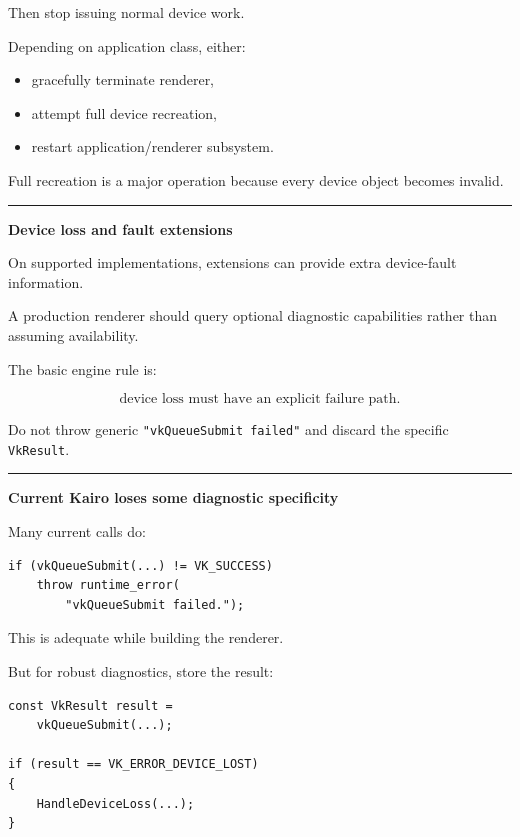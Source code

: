 Then stop issuing normal device work.

Depending on application class, either:

\begin{itemize}
\tightlist
\item
  gracefully terminate renderer,
\item
  attempt full device recreation,
\item
  restart application/renderer subsystem.
\end{itemize}

Full recreation is a major operation because every device object becomes invalid.

\begin{center}\rule{0.5\linewidth}{0.5pt}\end{center}

\textbf{Device loss and fault extensions}

On supported implementations, extensions can provide extra device-fault information.

A production renderer should query optional diagnostic capabilities rather than assuming availability.

The basic engine rule is:

\[
\boxed{
\text{device loss must have an explicit failure path}.
}
\]

Do not throw generic \texttt{"vkQueueSubmit\ failed"} and discard the specific \texttt{VkResult}.

\begin{center}\rule{0.5\linewidth}{0.5pt}\end{center}

\textbf{Current Kairo loses some diagnostic specificity}

Many current calls do:

\begin{verbatim}
if (vkQueueSubmit(...) != VK_SUCCESS)
    throw runtime_error(
        "vkQueueSubmit failed.");
\end{verbatim}

This is adequate while building the renderer.

But for robust diagnostics, store the result:

\begin{verbatim}
const VkResult result =
    vkQueueSubmit(...);

if (result == VK_ERROR_DEVICE_LOST)
{
    HandleDeviceLoss(...);
}
\end{verbatim}

